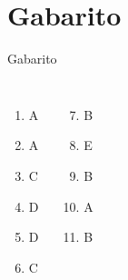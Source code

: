 \documentclass[11pt]{beamer}
\begin{document}
\section{Gabarito}

\begin{frame}{Gabarito}
    \begin{columns}

    \begin{enumerate}
      \item A
      \item A
      \item C
      \item D
      \item D
      \item C
    \end{enumerate}

    \begin{enumerate}
      \setcounter{enumi}{6}
      \item B
      \item E
      \item B
      \item A
      \item B
   
    \end{enumerate}

  \end{columns}
\end{frame}
\end{document}
